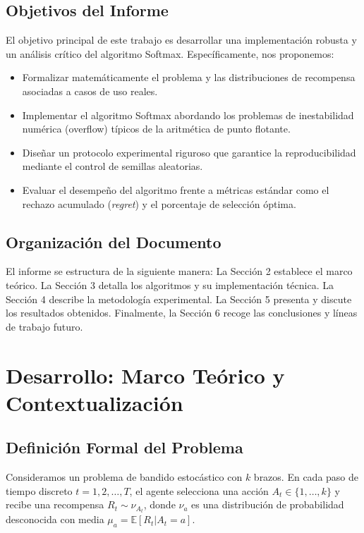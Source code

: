 \documentclass[a4paper,11pt]{article}
\begin{document}
\subsection{Objetivos del Informe}
El objetivo principal de este trabajo es desarrollar una implementación robusta y un análisis crítico del algoritmo Softmax. Específicamente, nos proponemos:
\begin{itemize}
    \item Formalizar matemáticamente el problema y las distribuciones de recompensa asociadas a casos de uso reales.
    \item Implementar el algoritmo Softmax abordando los problemas de inestabilidad numérica (overflow) típicos de la aritmética de punto flotante.
    \item Diseñar un protocolo experimental riguroso que garantice la reproducibilidad mediante el control de semillas aleatorias.
    \item Evaluar el desempeño del algoritmo frente a métricas estándar como el rechazo acumulado (\textit{regret}) y el porcentaje de selección óptima.
\end{itemize}

\subsection{Organización del Documento}
El informe se estructura de la siguiente manera: La Sección 2 establece el marco teórico. La Sección 3 detalla los algoritmos y su implementación técnica. La Sección 4 describe la metodología experimental. La Sección 5 presenta y discute los resultados obtenidos. Finalmente, la Sección 6 recoge las conclusiones y líneas de trabajo futuro.

\section{Desarrollo: Marco Teórico y Contextualización}

\subsection{Definición Formal del Problema}
Consideramos un problema de bandido estocástico con $k$ brazos. En cada paso de tiempo discreto $t=1, 2, \dots, T$, el agente selecciona una acción $A_t \in \{1, \dots, k\}$ y recibe una recompensa $R_t \sim \nu_{A_t}$, donde $\nu_a$ es una distribución de probabilidad desconocida con media $\mu_a = \mathbb{E}[R_t | A_t = a]$.
\end{document}
